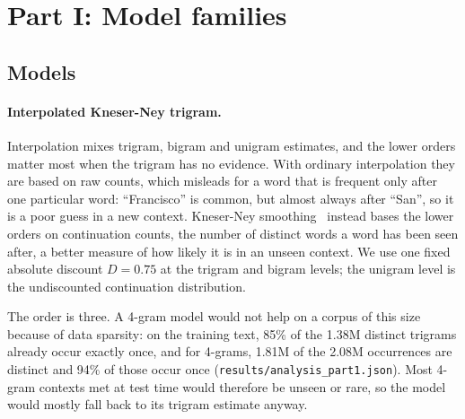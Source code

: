 \documentclass[10pt]{article}
\newcommand{\tok}[1]{\texttt{#1}}
\begin{document}
\section{Part I: Model families}

\subsection{Models}

\paragraph{Interpolated Kneser-Ney trigram.} Interpolation mixes trigram, bigram and unigram estimates, and the lower orders matter most when the trigram has no evidence. With ordinary interpolation they are based on raw counts, which misleads for a word that is frequent only after one particular word: ``Francisco'' is common, but almost always after ``San'', so it is a poor guess in a new context. Kneser-Ney smoothing~\cite{kneser1995,chen1999} instead bases the lower orders on continuation counts, the number of distinct words a word has been seen after, a better measure of how likely it is in an unseen context. We use one fixed absolute discount $D = 0.75$ at the trigram and bigram levels; the unigram level is the undiscounted continuation distribution.

The order is three. A 4-gram model would not help on a corpus of this size because of data sparsity: on the training text, 85\% of the 1.38M distinct trigrams already occur exactly once, and for 4-grams, 1.81M of the 2.08M occurrences are distinct and 94\% of those occur once (\tok{results/analysis\_part1.json}). Most 4-gram contexts met at test time would therefore be unseen or rare, so the model would mostly fall back to its trigram estimate anyway.
\end{document}
